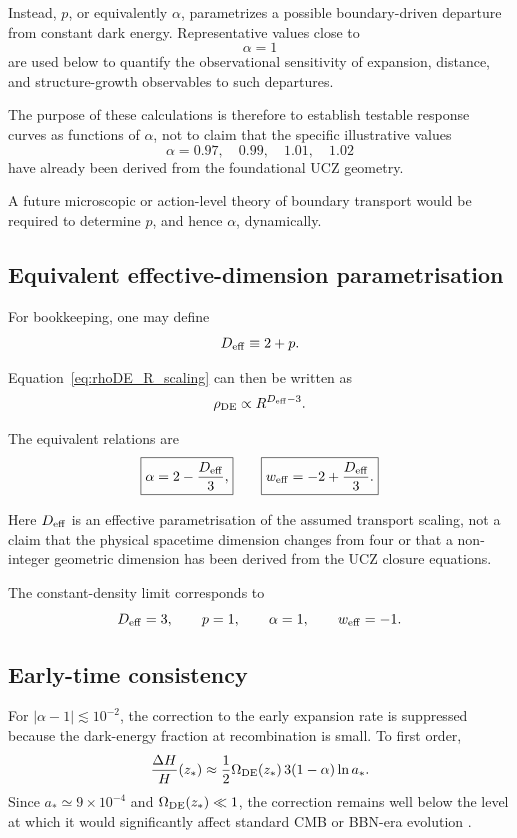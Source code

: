 \documentclass[12pt]{article}
\begin{document}
Instead, $p$, or equivalently $\alpha$, parametrizes a possible
boundary-driven departure from constant dark energy. Representative
values close to
\[
\alpha=1
\]
are used below to quantify the observational sensitivity of expansion,
distance, and structure-growth observables to such departures.

The purpose of these calculations is therefore to establish testable
response curves as functions of $\alpha$, not to claim that the
specific illustrative values
\[
\alpha=0.97,\quad0.99,\quad1.01,\quad1.02
\]
have already been derived from the foundational UCZ geometry.

A future microscopic or action-level theory of boundary transport would
be required to determine $p$, and hence $\alpha$, dynamically.

\subsection{Equivalent effective-dimension parametrisation}

For bookkeeping, one may define
\begin{equation}
D_{\rm eff}\equiv2+p.
\end{equation}

Equation~\eqref{eq:rhoDE_R_scaling} can then be written as
\[
\rho_{\rm DE}\propto R^{D_{\rm eff}-3}.
\]

The equivalent relations are
\begin{equation}
\boxed{
\alpha
=
2-\frac{D_{\rm eff}}{3},
}
\qquad
\boxed{
w_{\rm eff}
=
-2+\frac{D_{\rm eff}}{3}.
}
\label{eq:alpha_Deff}
\end{equation}

Here $D_{\rm eff}$ is an effective parametrisation of the assumed
transport scaling, not a claim that the physical spacetime dimension
changes from four or that a non-integer geometric dimension has been
derived from the UCZ closure equations.

The constant-density limit corresponds to
\[
D_{\rm eff}=3,
\qquad
p=1,
\qquad
\alpha=1,
\qquad
w_{\rm eff}=-1.
\]

\subsection{Early-time consistency}

For $|\alpha-1|\lesssim10^{-2}$, the correction to the early expansion rate
is suppressed because the dark-energy fraction at recombination is small.
To first order,
\begin{equation}
\frac{\Delta H}{H}(z_*)
\approx
\frac{1}{2}\Omega_{\rm DE}(z_*)\,3(1-\alpha)\ln a_*.
\end{equation}
Since $a_*\simeq9\times10^{-4}$ and
$\Omega_{\rm DE}(z_*)\ll1$, the correction remains well below the level at
which it would significantly affect standard CMB or BBN-era evolution
\cite{Planck2020,Weinberg2008,LesgourguesPastor2006}.
\end{document}
